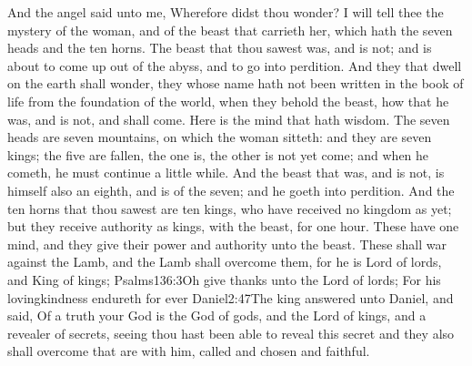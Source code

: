  And the angel said unto me, Wherefore didst thou wonder? I will tell thee the mystery of the woman, and of the beast that carrieth her, which hath the seven heads and the ten horns. 
 The beast that thou sawest was, and is not; and is about to come up out of the abyss, and to go into perdition. And they that dwell on the earth shall wonder, they whose name hath not been written in the book of life from the foundation of the world, when they behold the beast, how that he was, and is not, and shall come. 
 Here is the mind that hath wisdom. The seven heads are seven mountains, on which the woman sitteth: 
 and they are seven kings; the five are fallen, the one is, the other is not yet come; and when he cometh, he must continue a little while. 
 And the beast that was, and is not, is himself also an eighth, and is of the seven; and he goeth into perdition. 
 And the ten horns that thou sawest are ten kings,%
 who have received no kingdom as yet; but they receive authority as kings, with the beast, for one hour. 
 These have one mind, and they give their power and authority unto the beast. 
 These shall war against the Lamb, and the Lamb shall overcome them, for he is Lord of lords, and King of kings;%
				  {Psalms}{136:3}{Oh give thanks unto the Lord of lords; For his lovingkindness endureth for ever}%
				   {Daniel}{2:47}{The king answered unto Daniel, and said, Of a truth your God is the God of gods, and the Lord of kings, and a revealer of secrets, seeing thou hast been able to reveal this secret}
 and they also shall overcome that are with him, called and chosen and faithful. 

